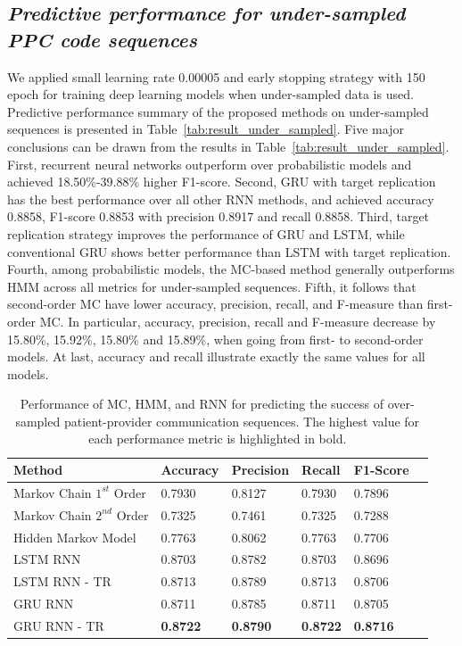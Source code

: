 \documentclass{amia_summit_2018}
\begin{document}
\subsection*{\textit{Predictive performance for under-sampled PPC code sequences}}
We applied small learning rate 0.00005 and early stopping strategy with 150 epoch for training deep learning models when under-sampled data is used. Predictive performance summary of the proposed methods on under-sampled sequences is presented in Table~\ref{tab:result_under_sampled}. Five major conclusions can be drawn from the results in Table~\ref{tab:result_under_sampled}. First, recurrent neural networks outperform over probabilistic models and achieved 18.50\%-39.88\% higher F1-score. Second, GRU with target replication has the best performance over all other RNN methods, and achieved accuracy 0.8858, F1-score 0.8853 with precision 0.8917 and recall 0.8858. Third, target replication strategy improves the performance of GRU and LSTM, while conventional GRU shows better performance than LSTM with target replication. Fourth, among probabilistic models, the MC-based method generally outperforms HMM across all metrics for under-sampled sequences. Fifth, it follows that second-order MC have lower accuracy, precision, recall, and F-measure than first-order MC. In particular, accuracy, precision, recall and F-measure decrease by 15.80\%, 15.92\%, 15.80\% and 15.89\%, when going from first- to second-order models. At last, accuracy and recall illustrate exactly the same values for all models. \\

\begin{table}[h]
\centering
\caption{Performance of MC, HMM, and RNN for predicting the success of over-sampled patient-provider communication sequences. The highest value for each performance metric is highlighted in bold.}
\label{tab:result_over_sampled}
  \begin{tabular}{|l|l|l|l|l|l|}
  \hline
   \textbf{Method} & \textbf{Accuracy}  & \textbf{Precision}  & \textbf{Recall} & \textbf{F1-Score}\\ \hline    
    
 Markov Chain $1^{st}$ Order & 0.7930 & 0.8127 & 0.7930 & 0.7896\\ \hline
 Markov Chain $2^{nd}$ Order & 0.7325 & 0.7461 & 0.7325 & 0.7288\\ \hline
 Hidden Markov Model & 0.7763 & 0.8062 & 0.7763 & 0.7706\\ \hline
 LSTM RNN & 0.8703 & 0.8782 & 0.8703 & 0.8696\\ \hline
 LSTM RNN - TR & 0.8713 & 0.8789 & 0.8713 & 0.8706\\ \hline
 GRU RNN & 0.8711 & 0.8785 & 0.8711 & 0.8705\\ \hline
 GRU RNN - TR & \textbf{0.8722} & \textbf{0.8790} & \textbf{0.8722} & \textbf{0.8716}\\ \hline
  \end{tabular}
\end{table}
\end{document}
